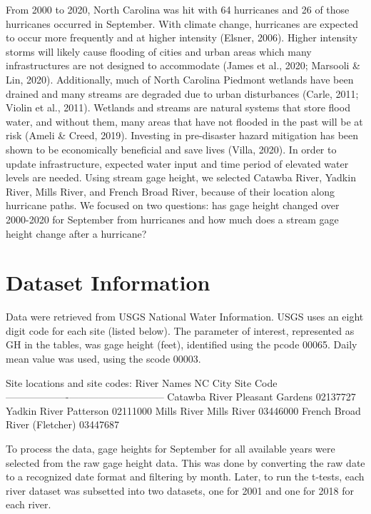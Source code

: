 \documentclass[12pt,]{article}
\begin{document}
From 2000 to 2020, North Carolina was hit with 64 hurricanes and 26 of
those hurricanes occurred in September. With climate change, hurricanes
are expected to occur more frequently and at higher intensity (Elsner,
2006). Higher intensity storms will likely cause flooding of cities and
urban areas which many infrastructures are not designed to accommodate
(James et al., 2020; Marsooli \& Lin, 2020). Additionally, much of North
Carolina Piedmont wetlands have been drained and many streams are
degraded due to urban disturbances (Carle, 2011; Violin et al., 2011).
Wetlands and streams are natural systems that store flood water, and
without them, many areas that have not flooded in the past will be at
risk (Ameli \& Creed, 2019). Investing in pre-disaster hazard mitigation
has been shown to be economically beneficial and save lives (Villa,
2020). In order to update infrastructure, expected water input and time
period of elevated water levels are needed. Using stream gage height, we
selected Catawba River, Yadkin River, Mills River, and French Broad
River, because of their location along hurricane paths. We focused on
two questions: has gage height changed over 2000-2020 for September from
hurricanes and how much does a stream gage height change after a
hurricane?

\newpage

\hypertarget{dataset-information}{%
\section{Dataset Information}\label{dataset-information}}

Data were retrieved from USGS National Water Information. USGS uses an
eight digit code for each site (listed below). The parameter of
interest, represented as GH in the tables, was gage height (feet),
identified using the pcode 00065. Daily mean value was used, using the
scode 00003.

Site locations and site codes: River Names \textbar{} NC City \textbar{}
Site Code \textbar{}\\
-------------------\textbar{}------------------\textbar{}-----------\textbar{}
Catawba River \textbar{} Pleasant Gardens \textbar{} 02137727 \textbar{}
Yadkin River \textbar{} Patterson \textbar{} 02111000 \textbar{} Mills
River \textbar{} Mills River \textbar{} 03446000 \textbar{} French Broad
River \textbar{} (Fletcher) \textbar{} 03447687 \textbar{}

To process the data, gage heights for September for all available years
were selected from the raw gage height data. This was done by converting
the raw date to a recognized date format and filtering by month. Later,
to run the t-tests, each river dataset was subsetted into two datasets,
one for 2001 and one for 2018 for each river.
\end{document}
